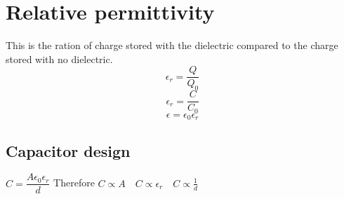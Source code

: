 \documentclass{article}[18pt]
\begin{document}
\section{Relative permittivity}
This is the ration of charge stored with the dielectric compared to the charge stored with no dielectric.\\
$$\epsilon_r=\dfrac{Q}{Q_0}$$
$$\epsilon_r=\dfrac{C}{C_0}$$
$$\epsilon=\epsilon_0\epsilon_r$$
\subsection{Capacitor design}
$C=\dfrac{A\epsilon_0\epsilon_r}{d}$ Therefore $C\propto A \quad C\propto \epsilon_r \quad C\propto \frac{1}{d}$
\end{document}
